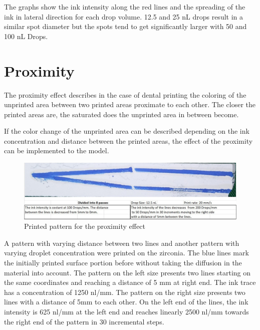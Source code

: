 \bigskip

The graphs show the ink intensity along the red lines and the spreading of the ink in lateral direction for each drop volume. 12.5 and 25 nL drops result in a similar spot diameter but the spots tend to get significantly larger with 50 and 100 nL Drops.

\section{Proximity}
The proximity effect describes in the case of dental printing the coloring of the unprinted area between two printed areas proximate to each other. The closer the printed areas are, the saturated does the unprinted area in between become.

If the color change of the unprinted area can be described depending on the ink concentration and distance between the printed areas, the effect of the proximity can be implemented to the model.

\bigskip

\begin{figure}[H]
	\centering
	\includegraphics[width=1\textwidth]{grafiken/proximityprint.jpg}
	\caption{Printed pattern for the proximity effect}
	\label{fig:proximityprint}
\end{figure} 

\bigskip

A pattern with varying distance between two lines and another pattern with varying droplet concentration were printed on the zirconia. The blue lines mark the initially printed surface portion before without taking the diffusion in the material into account. The pattern on the left size presents two lines starting on the same coordinates and reaching a distance of 5 mm at right end. The ink trace has a concentration of 1250 nl/mm. The pattern on the right size presents two lines with a distance of 5mm to each other. On the left end of the lines, the ink intensity is 625 nl/mm at  the left end and reaches linearly 2500 nl/mm towards the right end of the pattern in 30 incremental steps.

\bigskip

